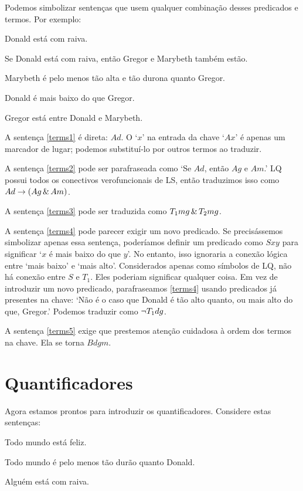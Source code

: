 Podemos simbolizar sentenças que usem qualquer combinação desses predicados e termos. Por exemplo:
\begin{earg}
\item[\ex{terms1}] Donald está com raiva.
\item[\ex{terms2}] Se Donald está com raiva, então Gregor e Marybeth também estão.
\item[\ex{terms3}] Marybeth é pelo menos tão alta e tão durona quanto Gregor.
\item[\ex{terms4}] Donald é mais baixo do que Gregor.
\item[\ex{terms5}] Gregor está entre Donald e Marybeth.
\end{earg}

A sentença \ref{terms1} é direta: $Ad$. O `$x$' na entrada da chave `$Ax$' é apenas um marcador de lugar; podemos substituí-lo por outros termos ao traduzir.

A sentença \ref{terms2} pode ser parafraseada como `Se $Ad$, então $Ag$ e $Am$.' LQ possui todos os conectivos verofuncionais de LS, então traduzimos isso como $Ad \rightarrow (Ag \,\&\, Am)$.

A sentença \ref{terms3} pode ser traduzida como $T_1mg \,\&\, T_2mg$.

A sentença \ref{terms4} pode parecer exigir um novo predicado. Se precisássemos simbolizar apenas essa sentença, poderíamos definir um predicado como $Sxy$ para significar `$x$ é mais baixo do que $y$'. No entanto, isso ignoraria a conexão lógica entre `mais baixo' e `mais alto'. Considerados apenas como símbolos de LQ, não há conexão entre $S$ e $T_1$. Eles poderiam significar qualquer coisa. Em vez de introduzir um novo predicado, parafraseamos \ref{terms4} usando predicados já presentes na chave: `Não é o caso que Donald é tão alto quanto, ou mais alto do que, Gregor.' Podemos traduzir como $\neg T_1dg$.

A sentença \ref{terms5} exige que prestemos atenção cuidadosa à ordem dos termos na chave. Ela se torna $Bdgm$.


\section{Quantificadores}
Agora estamos prontos para introduzir os quantificadores. Considere estas sentenças:
\begin{earg}
\item[\ex{q.a}] Todo mundo está feliz.
\item[\ex{q.ac}] Todo mundo é pelo menos tão durão quanto Donald.
\item[\ex{q.e}] Alguém está com raiva.
\end{earg}

